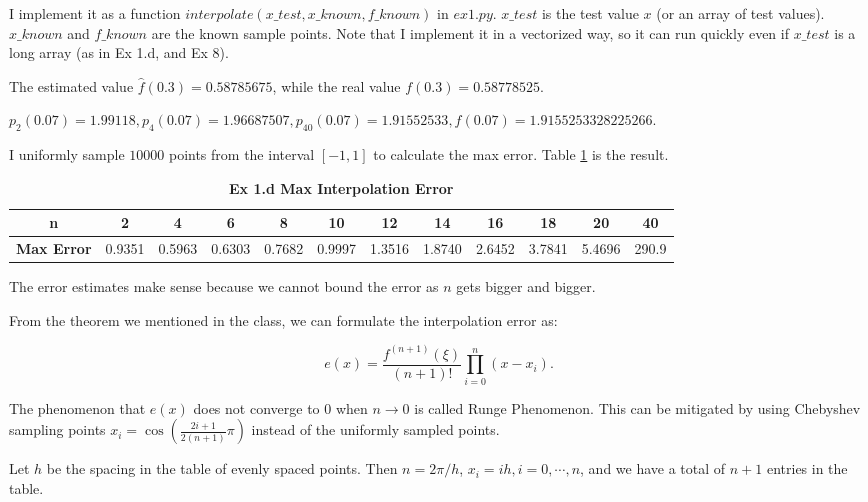 \documentclass[
  course = {{16-811 Math Fundamentals for Robotics}},
  quartile = {{1}},
  assignment = 2,
  name = {{Kangle Deng}},
  email = {{kangled@andrew.cmu.edu}},
  firstexercise = 1
]{aga-homework}
\begin{document}
\exercise
\subexercise I implement it as a function $interpolate(x\_test, x\_known, f\_known)$ in $ex1.py$. $x\_test$ is the test value $x$ (or an array of test values). $x\_known$ and $f\_known$ are the known sample points. Note that I implement it in a vectorized way, so it can run quickly even if $x\_test$ is a long array (as in Ex 1.d, and Ex 8).

\subexercise The estimated value $\hat{f}(0.3) = 0.58785675$, while the real value $f(0.3) = 0.58778525$.

\subexercise $p_2(0.07) = 1.99118, p_4(0.07) = 1.96687507, p_{40}(0.07) = 1.91552533, f(0.07) = 1.9155253328225266$.

\subexercise
I uniformly sample $10000$ points from the interval $[-1, 1]$ to calculate the max error. Table \ref{tab:ex1d} is the result.

\begin{table}[h]
  \begin{center}
  \scriptsize{
    \begin{tabular}{cccccccccccc}
      \toprule
      \textbf{n} & 2 & 4 & 6 & 8 & 10 & 12 & 14 & 16 & 18 & 20 & 40\\
      \midrule
      \textbf{Max Error} & 0.9351 & 0.5963 & 0.6303 & 0.7682 & 0.9997 & 1.3516 & 1.8740 & 2.6452 & 3.7841 & 5.4696 & 290.9\\
      \bottomrule
    \end{tabular}
    }
  \end{center}
\caption{\textbf{Ex 1.d Max Interpolation Error}} 
  \label{tab:ex1d}
\end{table}

The error estimates make sense because we cannot bound the error as $n$ gets bigger and bigger.

From the theorem we mentioned in the class, we can formulate the interpolation error as:

\begin{equation*}
    e(x) = \frac{f^{(n+1)}(\xi)}{(n+1)!} \prod \limits_{i=0}^n (x-x_i).
\end{equation*}

The phenomenon that $e(x)$ does not converge to $0$ when $n \rightarrow 0$ is called Runge Phenomenon. This can be mitigated by using Chebyshev sampling points $x_{i}=\cos \left(\frac{2 i+1}{2(n+1)} \pi\right)$ instead of the uniformly sampled points.

\exercise
Let $h$ be the spacing in the table of evenly spaced points. Then $n = 2\pi/h$, $x_i = ih, i = 0, \cdots, n$, and we have a total of $n+1$ entries in the table.
\end{document}
